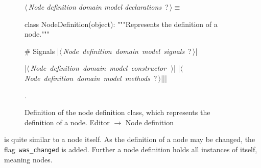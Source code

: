 \documentclass[%
    a4paper,    %
    justified,  %
    nobib,      %
    openany     %
]{tufte-book}
\begin{document}
\begin{figure}
\begin{flushleft} \small
\begin{minipage}{\linewidth}\label{scrap120}\raggedright\small
{} $\langle\,${\itshape Node definition domain model declarations}\nobreak\ {\footnotesize {?}}$\,\rangle\equiv$
\vspace{-1ex}
\begin{pythoncode}
class NodeDefinition(object):
    """Represents the definition of a node."""

    # Signals
    |\hbox{$\langle\,${\itshape Node definition domain model signals}\nobreak\ {\footnotesize ?}$\,\rangle$}|

    |\hbox{$\langle\,${\itshape Node definition domain model constructor}\nobreak\ {\footnotesize {}}$\,\rangle$}|
    |\hbox{$\langle\,${\itshape Node definition domain model methods}\nobreak\ {\footnotesize ?}$\,\rangle$}||\NWsep|
\end{pythoncode}
\vspace{1.5ex}
\footnotesize
\begin{list}{}{\setlength{\itemsep}{-\parsep}\setlength{\itemindent}{-\leftmargin}}
\item {\NWtxtMacroNoRef}.

\item{}
\end{list}
\end{minipage}\vspace{4ex}
\end{flushleft}
\caption{Definition of the node definition class, which represents the definition
  of a node.
  \newline{}\newline{}Editor $\rightarrow$ Node definition}
\label{editor:lst:node-definition}
\end{figure}

 is quite similar to a node itself. As the
definition of a node may be changed, the flag~\verb=was_changed= is added.
Further a node definition holds all instances of itself, meaning nodes.
\end{document}
